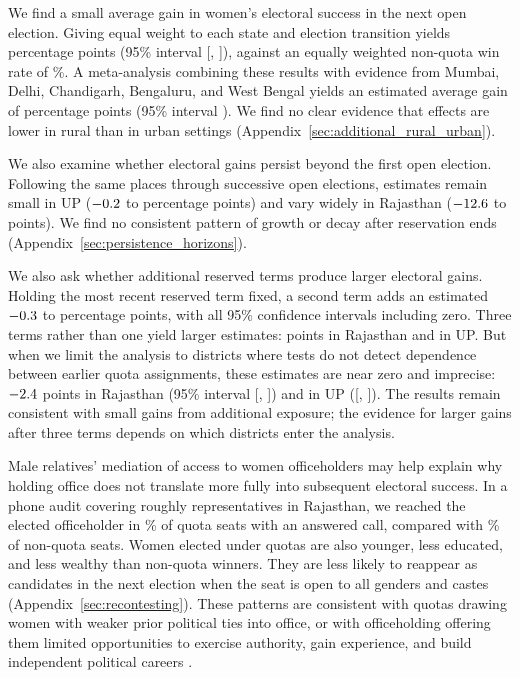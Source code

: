 \documentclass[11pt]{article}
\begin{document}
We find a small average gain in women's electoral success in the next open election. Giving equal weight to each state and election transition yields \poolEstimate{} percentage points (95\% interval [\poolLow{}, \poolHigh{}]), against an equally weighted non-quota win rate of \poolControl{}\%. A meta-analysis combining these results with evidence from Mumbai, Delhi, Chandigarh, Bengaluru, and West Bengal yields an estimated average gain of \appMetaEstimate{} percentage points (95\% interval \appMetaInterval{}). We find no clear evidence that effects are lower in rural than in urban settings (Appendix~\ref{sec:additional_rural_urban}).

We also examine whether electoral gains persist beyond the first open election. Following the same places through successive open elections, estimates remain small in UP ($-0.2{}$ to \persistUpDoubleFirst{} percentage points) and vary widely in Rajasthan ($-12.6{}$ to \persistRajLaterSecond{} points). We find no consistent pattern of growth or decay after reservation ends (Appendix~\ref{sec:persistence_horizons}).

\par
We also ask whether additional reserved terms produce larger electoral gains. Holding the most recent reserved term fixed, a second term adds an estimated $-0.3{}$ to \twoTermExtraMax{} percentage points, with all 95\% confidence intervals including zero. Three terms rather than one yield larger estimates: \rajFullExtra{} points in Rajasthan and \upFullExtra{} in UP. But when we limit the analysis to districts where tests do not detect dependence between earlier quota assignments, these estimates are near zero and imprecise: $-2.4{}$ points in Rajasthan (95\% interval [\rajRestrictedExtraLow{}, \rajRestrictedExtraHigh{}]) and \upRestrictedExtra{} in UP ([\upRestrictedExtraLow{}, \upRestrictedExtraHigh{}]). The results remain consistent with small gains from additional exposure; the evidence for larger gains after three terms depends on which districts enter the analysis.

Male relatives' mediation of access to women officeholders may help explain why holding office does not translate more fully into subsequent electoral success. In a phone audit covering roughly \abstractPhoneN{} representatives in Rajasthan, we reached the elected officeholder in \phoneQuotaMemberWhole{}\% of quota seats with an answered call, compared with \phoneOpenMemberWhole{}\% of non-quota seats. Women elected under quotas are also younger, less educated, and less wealthy than non-quota winners. They are less likely to reappear as candidates in the next election when the seat is open to all genders and castes (Appendix~\ref{sec:recontesting}). These patterns are consistent with quotas drawing women with weaker prior political ties into office, or with officeholding offering them limited opportunities to exercise authority, gain experience, and build independent political careers \citep{valdini2019inclusion, brule2023actually, meguid2025strategic}.
\end{document}
